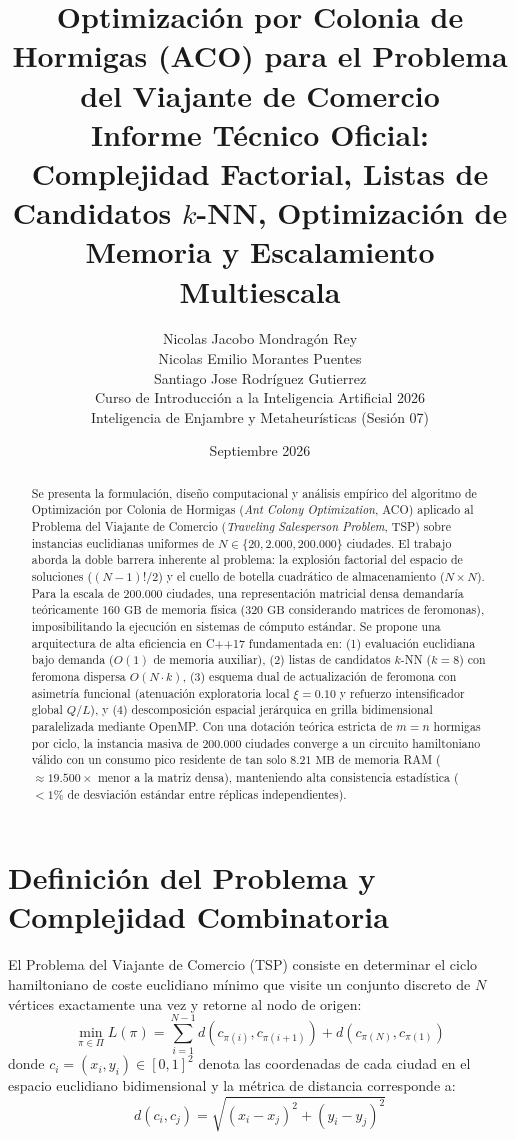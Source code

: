 \documentclass[11pt,a4paper]{article}
\title{Optimización por Colonia de Hormigas (ACO) para el Problema del Viajante de Comercio\\ \large Informe Técnico Oficial: Complejidad Factorial, Listas de Candidatos $k$-NN, Optimización de Memoria y Escalamiento Multiescala}
\author{
  Nicolas Jacobo Mondragón Rey \\
  Nicolas Emilio Morantes Puentes \\
  Santiago Jose Rodríguez Gutierrez \\[0.8em]
  Curso de Introducción a la Inteligencia Artificial 2026 \\
  \small Inteligencia de Enjambre y Metaheurísticas (Sesión 07)
}
\date{Septiembre 2026}
\begin{document}
\maketitle

\begin{abstract}
Se presenta la formulación, diseño computacional y análisis empírico del algoritmo de Optimización por Colonia de Hormigas (\emph{Ant Colony Optimization}, ACO) aplicado al Problema del Viajante de Comercio (\emph{Traveling Salesperson Problem}, TSP) sobre instancias euclidianas uniformes de $N \in \{20, 2.000, 200.000\}$ ciudades. El trabajo aborda la doble barrera inherente al problema: la explosión factorial del espacio de soluciones ($(N-1)!/2$) y el cuello de botella cuadrático de almacenamiento ($N \times N$). Para la escala de $200.000$ ciudades, una representación matricial densa demandaría teóricamente $160\text{ GB}$ de memoria física ($320\text{ GB}$ considerando matrices de feromonas), imposibilitando la ejecución en sistemas de cómputo estándar. Se propone una arquitectura de alta eficiencia en C++17 fundamentada en: (1) evaluación euclidiana bajo demanda ($O(1)$ de memoria auxiliar), (2) listas de candidatos $k$-NN ($k=8$) con feromona dispersa $O(N \cdot k)$, (3) esquema dual de actualización de feromona con asimetría funcional (atenuación exploratoria local $\xi=0.10$ y refuerzo intensificador global $Q/L$), y (4) descomposición espacial jerárquica en grilla bidimensional paralelizada mediante OpenMP. Con una dotación teórica estricta de $m=n$ hormigas por ciclo, la instancia masiva de $200.000$ ciudades converge a un circuito hamiltoniano válido con un consumo pico residente de tan solo \textbf{$8.21\text{ MB}$} de memoria RAM ($\approx 19.500\times$ menor a la matriz densa), manteniendo alta consistencia estadística ($< 1\%$ de desviación estándar entre réplicas independientes).
\end{abstract}

\section{Definición del Problema y Complejidad Combinatoria}

El Problema del Viajante de Comercio (TSP) consiste en determinar el ciclo hamiltoniano de coste euclidiano mínimo que visite un conjunto discreto de $N$ vértices exactamente una vez y retorne al nodo de origen:
\begin{equation}
    \min_{\pi \in \Pi} L(\pi) = \sum_{i=1}^{N-1} d\left(c_{\pi(i)}, c_{\pi(i+1)}\right) + d\left(c_{\pi(N)}, c_{\pi(1)}\right)
\end{equation}
donde $c_i = (x_i, y_i) \in [0, 1]^2$ denota las coordenadas de cada ciudad en el espacio euclidiano bidimensional y la métrica de distancia corresponde a:
\begin{equation}
    d(c_i, c_j) = \sqrt{(x_i - x_j)^2 + (y_i - y_j)^2}
\end{equation}
\end{document}
